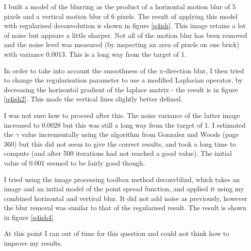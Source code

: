 \documentclass{article}
\begin{document}
I built a model of the blurring as the product of a horizontal motion blur of 5 pixels and a vertical motion blur of 6 pixels. The result of applying this model with regularised deconvolution is shown in figure \ref{q4ish}. This image retains a lot of noise but appears a little sharper. Not all of the motion blur has been removed and the noise level was measured (by inspecting an area of pixels on one brick) with variance 0.0013. This is a long way from the target of 1.

In order to take into account the smoothness of the x-direction blur, I then tried to change the regularisation parameter to use a modified Laplacian operator, by decreasing the horizontal gradient of the laplace matrix - the result is in figure \ref{q4ish2}. This made the vertical lines slightly better defined.

I was not sure how to proceed after this. The noise variance of the latter image increased to 0.0028 but this was still a long way from the target of 1. I estimated the $\gamma$ value incrementally using the algorithm from Gonzalez and Woods (page 360) but this did not seem to give the correct results, and took a long time to compute (and after 500 iterations had not reached a good value). The initial value of 0.001 seemed to be fairly good though.

I tried using the image processing toolbox method deconvblind, which takes an image and an initial model of the point spread function, and applied it using my combined horizontal and vertical blur. It did not add noise as previously, however the blur removal was similar to that of the regularised result. The result is shown in figure \ref{q4ish4}. 

At this point I ran out of time for this question and could not think how to improve my results.
\end{document}
